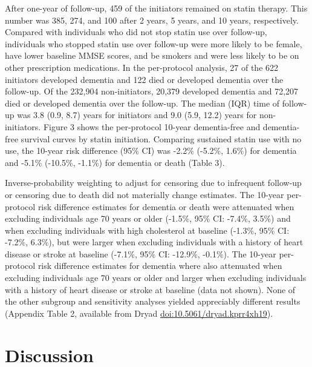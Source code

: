\documentclass[
]{book}
\begin{document}
After one-year of follow-up, 459 of the initiators remained on statin therapy. This number was 385, 274, and 100 after 2 years, 5 years, and 10 years, respectively. Compared with individuals who did not stop statin use over follow-up, individuals who stopped statin use over follow-up were more likely to be female, have lower baseline MMSE scores, and be smokers and were less likely to be on other prescription medications. In the per-protocol analysis, 27 of the 622 initiators developed dementia and 122 died or developed dementia over the follow-up. Of the 232,904 non-initiators, 20,379 developed dementia and 72,207 died or developed dementia over the follow-up. The median (IQR) time of follow-up was 3.8 (0.9, 8.7) years for initiators and 9.0 (5.9, 12.2) years for non-initiators. Figure 3 shows the per-protocol 10-year dementia-free and dementia-free survival curves by statin initiation. Comparing sustained statin use with no use, the 10-year risk difference (95\% CI) was -2.2\% (-5.2\%, 1.6\%) for dementia and -5.1\% (-10.5\%, -1.1\%) for dementia or death (Table 3).

Inverse-probability weighting to adjust for censoring due to infrequent follow-up or censoring due to death did not materially change estimates. The 10-year per-protocol risk difference estimates for dementia or death were attenuated when excluding individuals age 70 years or older (-1.5\%, 95\% CI: -7.4\%, 3.5\%) and when excluding individuals with high cholesterol at baseline (-1.3\%, 95\% CI: -7.2\%, 6.3\%), but were larger when excluding individuals with a history of heart disease or stroke at baseline (-7.1\%, 95\% CI: -12.9\%, -0.1\%). The 10-year per-protocol risk difference estimates for dementia where also attenuated when excluding individuals age 70 years or older and larger when excluding individuals with a history of heart disease or stroke at baseline (data not shown). None of the other subgroup and sensitivity analyses yielded appreciably different results (Appendix Table 2, available from Dryad \url{doi:10.5061/dryad.kprr4xh19}).

\hypertarget{discussion}{%
\section{Discussion}\label{discussion}}
\end{document}
